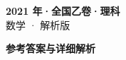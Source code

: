 \documentclass[zihao=-4, a4paper]{ctexart}
\begin{document}
\begin{center}
  {\Large\bfseries 2021 年·全国乙卷·理科}\\[4pt]
  {\large 数学 · 解析版}
\end{center}
\medskip
{}

\clearpage
{}
\begin{center}{\Large\bfseries 参考答案与详细解析}\end{center}
\medskip

\end{document}
